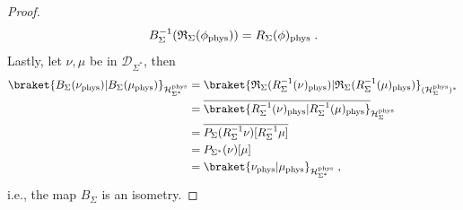 \documentclass[11pt]{article}
\newcommand{\be}{\begin{equation}}
\newcommand{\ee}{\end{equation}}
\newcommand{\Hil}{\mathcal{H}}
\newcommand{\cD}{\mathcal{D}}
\newcommand{\Hphys}{\mathcal{H}_{\Sigma}^{\rm phys}}
\theoremstyle{definition}
\numberwithin{equation}{section}
\begin{document}
\begin{proof}
\begin{equation}
    B_{\Sigma}^{-1}(\mathfrak{R}_{\Sigma}(\phi_{\rm phys}))=R_{\Sigma}(\phi)_{\rm phys}\;.
\end{equation}
Lastly, let $\nu,\mu$ be in $\cD_{\Sigma^*}$, then
\be
\begin{aligned}
        \braket{B_{\Sigma}(\nu_{\rm phys})|B_{\Sigma}(\mu_{\rm phys})}_{\Hil^{\rm phys}_{\Sigma^*}}&=\braket{\mathfrak{R}_{\Sigma}(R_{\Sigma}^{-1}(\nu)_{\rm phys})|\mathfrak{R}_{\Sigma}(R_{\Sigma}^{-1}(\mu)_{\rm phys})}_{(\Hphys)^*}\\
    &=\overline{\braket{R_{\Sigma}^{-1}(\nu)_{\rm phys}|R_{\Sigma}^{-1}(\mu)_{\rm phys}}}_{\Hphys}\\
    &=\overline{P_{\Sigma}(R_{\Sigma}^{-1}\nu)[R_{\Sigma}^{-1}\mu]}\\
    &=P_{\Sigma^*}(\nu)[\mu]\\
    &=\braket{\nu_{\rm phys}|\mu_{\rm phys}}_{\Hil^{\rm phys}_{\Sigma^*}}\;,
    \end{aligned}
\ee
i.e., the map $B_{\Sigma}$ is an isometry.
\end{proof}
\end{document}
